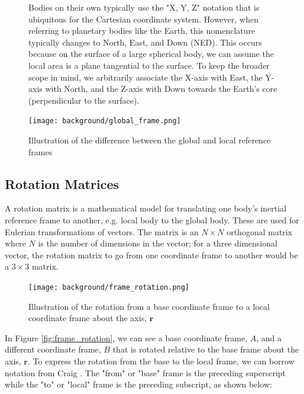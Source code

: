 \begin{figure}
    \begin{fitbox}[frametitle=Aside: Notation and Nomenclature for Rotations]
        Bodies on their own typically use the "X, Y, Z" notation that is ubiquitous for the Cartesian coordinate system.
        However, when referring to planetary bodies like the Earth, this nomenclature typically changes to North, East, and Down (NED).
        This occurs because on the surface of a large spherical body, we can assume the local area is a plane tangential to the surface.
        To keep the broader scope in mind, we arbitrarily associate the X-axis with East, the Y-axis with North, and the Z-axis with Down towards the Earth's core (perpendicular to the surface).

        \caption{Illustration of the difference between the global and local reference frames}
        \centering
        \texttt{[image: background/global\_frame.png]}
    \end{fitbox}
\end{figure}

\subsection{Rotation Matrices} 
A rotation matrix is a mathematical model for translating one body's inertial reference frame to another, e.g. local body to the global body.
These are used for Eulerian transformations of vectors.
The matrix is an $N \times N$ orthogonal matrix where $N$ is the number of dimensions in the vector;
for a three dimensional vector, the rotation matrix to go from one coordinate frame to another would be a $3 \times 3$ matrix.

\begin{figure}[h!]
    \caption{Illustration of the rotation from a base coordinate frame to a local coordinate frame about the axis, $\pmb{r}$}
    \centering
    \texttt{[image: background/frame\_rotation.png]}
\end{figure}

In Figure \ref{fig:frame_rotation}, we can see a base coordinate frame, $A$, and a different coordinate frame, $B$ that is rotated relative to the base frame about the axis, $\pmb{r}$.
To express the rotation from the base to the local frame, we can borrow notation from Craig \cite{Craig:2022}.
The "from" or "base" frame is the preceding superscript while the "to" or "local" frame is the preceding subscript, as shown below:

